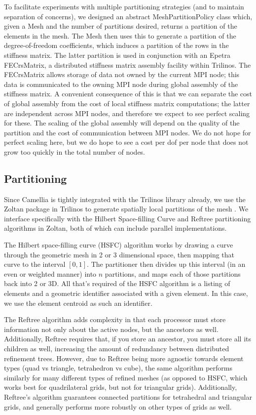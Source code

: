 \documentclass{article}
\begin{document}
To facilitate experiments with multiple partitioning strategies (and to maintain separation of concerns), we designed an abstract MeshPartitionPolicy class which, given a Mesh and the number of partitions desired, returns a partition of the elements in the mesh.  The Mesh then uses this to generate a partition of the degree-of-freedom coefficients, which induces a partition of the rows in the stiffness matrix.  The latter partition is used in conjunction with an Epetra FECrsMatrix, a distributed stiffness matrix assembly facility within Trilinos.  The FECrsMatrix allows storage of data not owned by the current MPI node; this data is communicated to the owning MPI node during global assembly of the stiffness matrix.  A convenient consequence of this is that we can separate the cost of global assembly from the cost of local stiffness matrix computations; the latter are independent across MPI nodes, and therefore we expect to see perfect scaling for these.  The scaling of the global assembly will depend on the quality of the partition and the cost of communication between MPI nodes.  We do not hope for perfect scaling here, but we do hope to see a cost per dof per node that does not grow too quickly in the total number of nodes.

\subsection{Partitioning}

Since Camellia is tightly integrated with the Trilinos library already, we use the Zoltan package in Trilinos to generate spatially local partitions of the mesh \cite{ZoltanOverviewArticle}. We interface specifically with the Hilbert Space-filling Curve and Reftree partitioning algorithms in Zoltan, both of which can include parallel implementations. 

The Hilbert space-filling curve (HSFC) algorithm works by drawing a curve through the geometric mesh in 2 or 3 dimensional space, then mapping that curve to the interval $[0,1]$. The partitioner then divides up this interval (in an even or weighted manner) into $n$ partitions, and maps each of those partitions back into 2 or 3D. All that's required of the HSFC algorithm is a listing of elements and a geometric identifier associated with a given element. In this case, we use the element centroid as such an identifier. 

The Reftree algorithm \cite{REFTREE} adds complexity in that each processor must store information not only about the active nodes, but the ancestors as well. Additionally, Reftree requires that, if you store an ancestor, you must store all its children as well, increasing the amount of redundancy between distributed refinement trees. However, due to Reftree being more agnostic towards element types (quad vs triangle, tetrahedron vs cube), the same algorithm performs similarly for many different types of refined meshes (as opposed to HSFC, which works best for quadrilateral grids, but not for triangular grids).  Additionally, Reftree's algorithm guarantees connected partitions for tetrahedral and triangular grids, and generally performs more robustly on other types of grids as well.  
\end{document}
